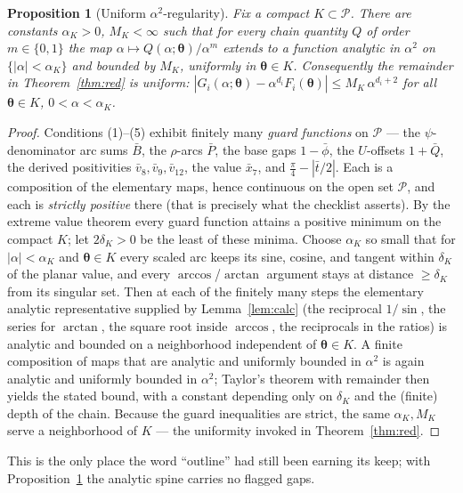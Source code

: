\documentclass[pdflatex,sn-mathphys-num]{sn-jnl}
\theoremstyle{thmstyleone}%
\newtheorem{proposition}{Proposition}%
\theoremstyle{thmstyletwo}%
\theoremstyle{thmstylethree}%
\begin{document}
\begin{proposition}[Uniform $\alpha^2$-regularity]\label{prop:unif}
Fix a compact $K\subset\mathcal P$. There are constants $\alpha_K>0$, $M_K<\infty$ such that for every chain quantity $Q$ of order $m\in\{0,1\}$ the map $\alpha\mapsto Q(\alpha;\boldsymbol\theta)/\alpha^{m}$ extends to a function analytic in $\alpha^2$ on $\{|\alpha|<\alpha_K\}$ and bounded by $M_K$, uniformly in $\boldsymbol\theta\in K$. Consequently the remainder in Theorem~\ref{thm:red} is uniform: $|G_i(\alpha;\boldsymbol\theta)-\alpha^{d_i}F_i(\boldsymbol\theta)|\le M_K\,\alpha^{d_i+2}$ for all $\boldsymbol\theta\in K$, $0<\alpha<\alpha_K$.
\end{proposition}
\begin{proof}
Conditions \textup{(1)--(5)} exhibit finitely many \emph{guard functions} on
$\mathcal P$ --- the $\psi$-denominator arc sums $\bar B$, the $\rho$-arcs $\bar P$, the base gaps $1-\bar\phi$, the $U$-offsets $1+\bar Q$, the derived positivities $\bar v_8,\bar v_9,\bar v_{12}$, the value $\bar x_7$, and $\tfrac\pi4-|\bar t/2|$. Each is a composition of the elementary maps, hence continuous on the open set $\mathcal P$, and each is \emph{strictly positive} there (that is precisely what the checklist asserts). By the extreme value theorem every guard function attains a positive minimum on the compact $K$; let $2\delta_K>0$ be the least of these minima. Choose $\alpha_K$ so small that for $|\alpha|<\alpha_K$ and $\boldsymbol\theta\in K$ every scaled arc keeps its sine, cosine, and tangent within $\delta_K$ of the planar value, and every $\arccos$/$\arctan$ argument stays at distance $\ge\delta_K$ from its singular set. Then at each of the finitely many steps the elementary analytic representative supplied by Lemma~\ref{lem:calc} (the reciprocal $1/\sin$, the series for $\arctan$, the square root inside $\arccos$, the reciprocals in the ratios) is analytic and bounded on a neighborhood independent of $\boldsymbol\theta\in K$. A finite composition of maps that are analytic and uniformly bounded in $\alpha^2$ is again analytic and uniformly bounded in $\alpha^2$; Taylor's theorem with remainder then yields the stated bound, with a constant depending only on $\delta_K$ and the (finite) depth of the chain. Because the guard inequalities are strict, the same $\alpha_K,M_K$ serve a neighborhood of $K$ --- the uniformity invoked in Theorem~\ref{thm:red}.
\end{proof}

\noindent This is the only place the word ``outline'' had still been earning its keep;
with Proposition~\ref{prop:unif} the analytic spine carries no flagged gaps.
\end{document}
